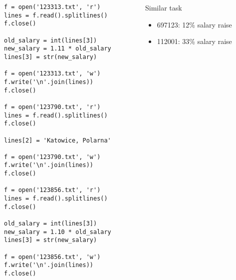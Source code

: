 \documentclass[aspectratio=169]{beamer}
\newcommand{\style}[1]{\ttfamily#1}
\begin{document}
\begin{frame}[fragile]
\begin{columns}
\begin{column}{0.5\textwidth}
\begin{lstlisting}[basicstyle=\style{\tiny}]
f = open('123313.txt', 'r')
lines = f.read().splitlines()
f.close()

old_salary = int(lines[3])
new_salary = 1.11 * old_salary
lines[3] = str(new_salary)

f = open('123313.txt', 'w')
f.write('\n'.join(lines))
f.close()

f = open('123790.txt', 'r')
lines = f.read().splitlines()
f.close()

lines[2] = 'Katowice, Polarna'

f = open('123790.txt', 'w')
f.write('\n'.join(lines))
f.close()

f = open('123856.txt', 'r')
lines = f.read().splitlines()
f.close()

old_salary = int(lines[3])
new_salary = 1.10 * old_salary
lines[3] = str(new_salary)

f = open('123856.txt', 'w')
f.write('\n'.join(lines))
f.close()
\end{lstlisting}
\end{column}
\begin{column}{0.5\textwidth}
Similar task
\begin{itemize}
  \item 697123: 12\% salary raise
  \item 112001: 33\% salary raise
\end{itemize}
\end{column}
\end{columns}
\end{frame}
\end{document}
